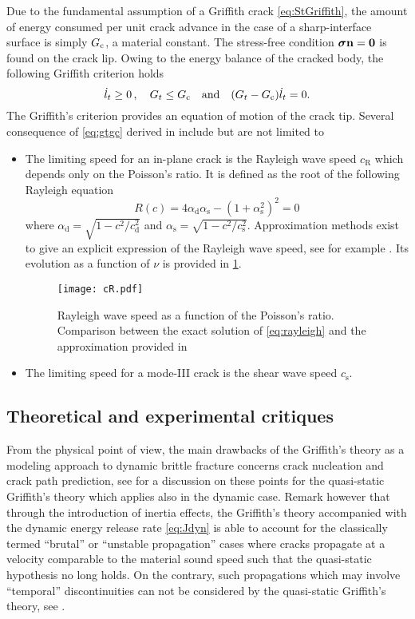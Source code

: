 Due to the fundamental assumption of a Griffith crack \eqref{eq:StGriffith}, the amount of energy consumed per unit crack advance in the case of a sharp-interface surface is simply $G_\mathrm{c}$, a material constant. The stress-free condition $\sig\vec{n}=\vec{0}$ is found on the crack lip. Owing to the energy balance of the cracked body, the following Griffith criterion holds
\begin{equation} \label{eq:gtgc}
\dot{l}_t\geq0\,,\quad G_t\leq G_\mathrm{c}\quad\text{and}\quad(G_t-G_\mathrm{c})\dot{l}_t=0.
\end{equation}
The Griffith's criterion provides an equation of motion of the crack tip. Several consequence of \eqref{eq:gtgc} derived in \cite{Freund:1990} include but are not limited to
\begin{itemize}
\item The limiting speed for an in-plane crack is the Rayleigh wave speed $c_\mathrm{R}$ which depends only on the Poisson's ratio. It is defined as the root of the following Rayleigh equation
\begin{equation} \label{eq:rayleigh}
R(c)=4\alpha_\mathrm{d}\alpha_\mathrm{s}-(1+\alpha_\mathrm{s}^2)^2=0
\end{equation}
where $\alpha_\mathrm{d}=\sqrt{1-c^2/c_\mathrm{d}^2}$ and $\alpha_\mathrm{s}=\sqrt{1-c^2/c_\mathrm{s}^2}$. Approximation methods exist to give an explicit expression of the Rayleigh wave speed, see for example \cite{RoyerClorennec:2007}. Its evolution as a function of $\nu$ is provided in \cref{fig:rayleigh}.
\begin{figure}[htbp]
\centering
\texttt{[image: cR.pdf]}
\caption{Rayleigh wave speed as a function of the Poisson's ratio. Comparison between the exact solution of \eqref{eq:rayleigh} and the approximation provided in \cite{RoyerClorennec:2007}} \label{fig:rayleigh}
\end{figure}

\item The limiting speed for a mode-III crack is the shear wave speed $c_\mathrm{s}$.
\end{itemize}

\subsection{Theoretical and experimental critiques} \label{sec:theoexpcrit}
From the physical point of view, the main drawbacks of the Griffith's theory as a modeling approach to dynamic brittle fracture concerns crack nucleation and crack path prediction, see \cite{FrancfortMarigo:1998} for a discussion on these points for the quasi-static Griffith's theory which applies also in the dynamic case. Remark however that through the introduction of inertia effects, the Griffith's theory accompanied with the dynamic energy release rate \eqref{eq:Jdyn} is able to account for the classically termed ``brutal'' or ``unstable propagation'' cases where cracks propagate at a velocity comparable to the material sound speed such that the quasi-static hypothesis no long holds. On the contrary, such propagations which may involve ``temporal'' discontinuities can not be considered by the quasi-static Griffith's theory, see \cite{FrancfortMarigo:1998}.


